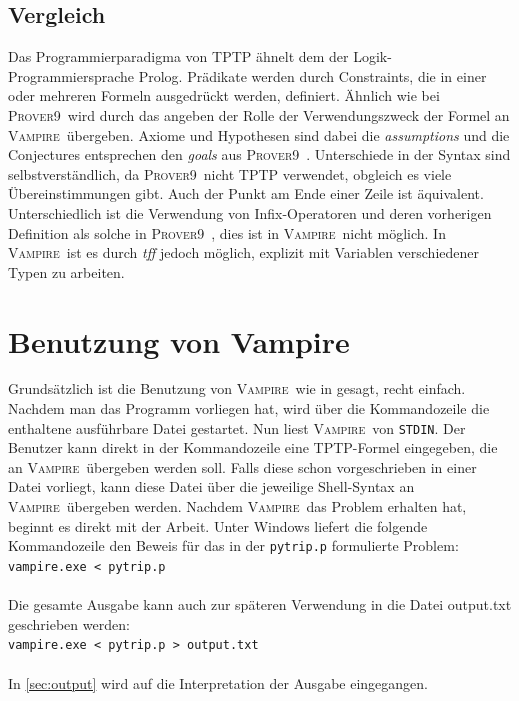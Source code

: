 \documentclass{article}
\newcommand{\vampire}{\textsc{Vampire}~}
\newcommand{\proverNine}{\textsc{Prover}9~}
\begin{document}
\subsection{Vergleich}
\label{subsec:tptpcomp}
Das Programmierparadigma von TPTP ähnelt dem der Logik-Programmiersprache Prolog.
Prädikate werden durch Constraints, die in einer oder mehreren Formeln ausgedrückt werden, definiert.
Ähnlich wie bei \proverNine wird durch das angeben der Rolle der Verwendungszweck der Formel an \vampire übergeben. Axiome und Hypothesen sind dabei die \textit{assumptions} und die Conjectures entsprechen den \textit{goals} aus \proverNine.
Unterschiede in der Syntax sind selbstverständlich, da \proverNine nicht TPTP verwendet, obgleich es viele Übereinstimmungen gibt.
Auch der Punkt am Ende einer Zeile ist äquivalent. Unterschiedlich ist die Verwendung von Infix-Operatoren und deren vorherigen Definition als solche in \proverNine, 
dies ist in \vampire nicht möglich. In \vampire ist es durch \textit{tff} jedoch möglich, explizit mit Variablen verschiedener Typen zu arbeiten.\cite{cav2013, prover9manual} 


\section{Benutzung von Vampire}
\label{sec:invocation}
Grundsätzlich ist die Benutzung von \vampire wie in \cite{cav2013} gesagt, recht einfach. Nachdem man das Programm vorliegen hat, wird über die Kommandozeile die enthaltene ausführbare Datei gestartet. Nun liest \vampire von \texttt{STDIN}. Der Benutzer kann direkt in der Kommandozeile eine TPTP-Formel eingegeben, die an \vampire übergeben werden soll. Falls diese schon vorgeschrieben in einer Datei vorliegt, kann diese Datei über die jeweilige Shell-Syntax an \vampire übergeben werden. Nachdem \vampire das Problem erhalten hat, beginnt es direkt mit der Arbeit. 
Unter Windows liefert die folgende Kommandozeile den Beweis für das in der \verb|pytrip.p| 
formulierte Problem:\\

\texttt{vampire.exe < pytrip.p}\\\\
Die gesamte Ausgabe kann auch zur späteren Verwendung in die Datei output.txt geschrieben werden:\\

\texttt{vampire.exe < pytrip.p > output.txt}\\\\
In \ref{sec:output} wird auf die Interpretation der Ausgabe eingegangen.
\end{document}
